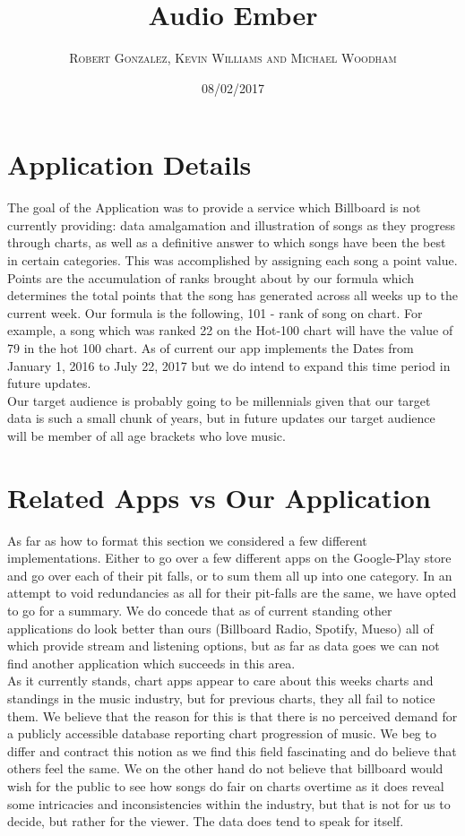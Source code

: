 \documentclass{article}
\newcommand\tab[1][1cm]{\hspace*{#1}}
\begin{document}
\setlength\parindent{24pt}
\title{\textbf{Audio Ember}}
\author{\textsc{Robert Gonzalez, Kevin Williams and Michael Woodham}}
\date{08/02/2017}
\maketitle


\section*{Application Details}
The goal of the Application was to provide a service which Billboard is not currently providing:
data amalgamation and illustration of songs as they progress through charts, as well as a definitive answer to which songs have been the best in certain categories.
This was accomplished by assigning each song a point value.
Points are the accumulation of ranks brought about by our formula which determines the total points that the song has generated across all weeks up to the current week. 
Our formula is the following, 101 - rank of song on chart. 
For example, a song which was ranked 22 on the Hot-100 chart will have the value of 79 in the hot 100 chart.
As of current our app implements the Dates from January 1, 2016 to July 22, 2017 but we do intend to expand this time period in future updates.
\\ \tab Our target audience is probably going to be millennials given that our target data is such a small chunk of years, but in future updates our target audience will be member of all age brackets who love music.

\section*{Related Apps vs Our Application}
As far as how to format this section we considered a few different implementations.
Either to go over a few different apps on the Google-Play store and go over each of their pit falls, or to sum them all up into one category. 
In an attempt to void redundancies as all for their pit-falls are the same, we have opted to go for a summary. 
We do concede that as of current standing other applications do look better than ours (Billboard Radio, Spotify, Mueso) all of which provide stream and listening options,
but as far as data goes we can not find another application which succeeds in this area.
\\ \tab As it currently stands, chart apps appear to care about this weeks charts and standings in the music industry, but for previous charts, they all fail to notice them. 
We believe that the reason for this is that there is no perceived demand for a publicly accessible database reporting chart progression of music.
We beg to differ and contract this notion as we find this field fascinating and do believe that others feel the same.
We on the other hand do not believe that billboard would wish for the public to see how songs do fair on charts overtime as it does reveal some intricacies and inconsistencies within the industry,
but that is not for us to decide, but rather for the viewer. 
The data does tend to speak for itself.
\end{document}
